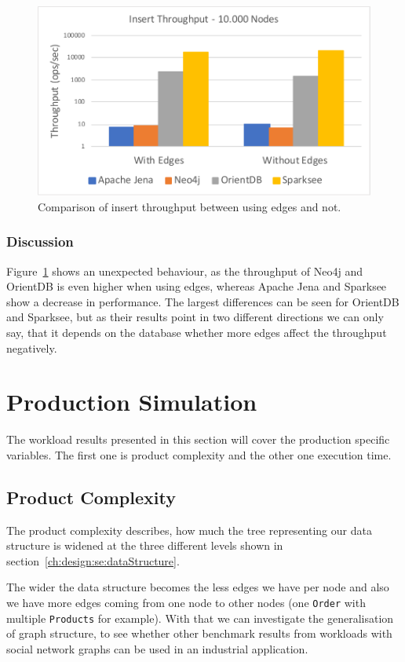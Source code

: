 \begin{figure}[h!]
  \centering
  \includegraphics[width=.75\textwidth]{images/throughput/indexNoEdges10000Nodes}
  \caption{Comparison of insert throughput between using edges and not.}
  \label{fig:indexNoEdges10000Nodes}
\end{figure}

\subsubsection{Discussion}
\label{ch:evaluation:se:edgeDiscussion}
Figure~\ref{fig:indexNoEdges10000Nodes} shows an unexpected behaviour,
as the throughput of Neo4j and OrientDB is even higher when using edges,
whereas Apache Jena and Sparksee show a decrease in performance.
The largest differences can be seen for OrientDB and Sparksee,
but as their results point in two different directions we can only say,
that it depends on the database whether more edges affect the throughput negatively.

\section{Production Simulation}
\label{ch:evaluation:se:productionSimulation}
The workload results presented in this section will cover the production specific variables.
The first one is product complexity and the other one execution time.

\subsection{Product Complexity}
\label{ch:evaluation:se:productComplexity}
The product complexity describes,
how much the tree representing our data structure is widened at the three different levels shown in section~\ref{ch:design:se:dataStructure}.

The wider the data structure becomes the less edges we have per node and also we have more edges coming from one node to other nodes (one \texttt{Order} with multiple \texttt{Products} for example).
With that we can investigate the generalisation of graph structure,
to see whether other benchmark results from workloads with social network graphs can be used in an industrial application.

